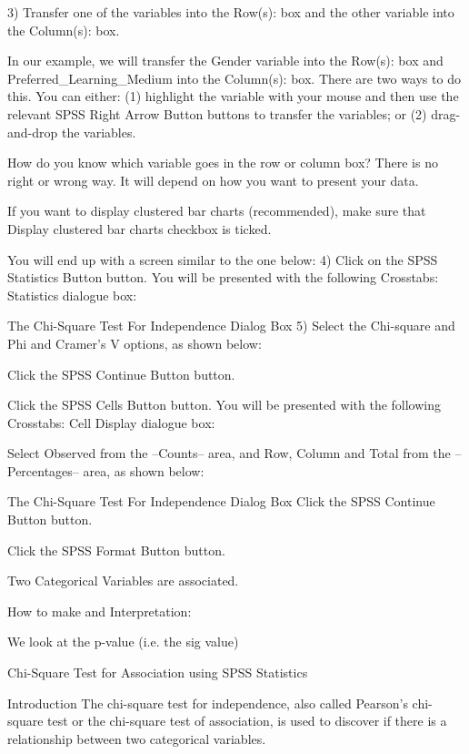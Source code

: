 3) Transfer one of the variables into the Row(s): box and the other variable into the Column(s): box. 

In our example, we will transfer the Gender variable into the Row(s): box and Preferred_Learning_Medium into the Column(s): box. There are two ways to do this. You can either: (1) highlight the variable with your mouse and then use the relevant SPSS Right Arrow Button buttons to transfer the variables; or (2) drag-and-drop the variables. 

How do you know which variable goes in the row or column box? There is no right or wrong way. It will depend on how you want to present your data.

If you want to display clustered bar charts (recommended), make sure that Display clustered bar charts checkbox is ticked.

You will end up with a screen similar to the one below:
4) Click on the SPSS Statistics Button button. You will be presented with the following Crosstabs: Statistics dialogue box:

The Chi-Square Test For Independence Dialog Box
5) Select the Chi-square and Phi and Cramer's V options, as shown below:

Click the SPSS Continue Button button.

Click the SPSS Cells Button button. You will be presented with the following Crosstabs: Cell Display dialogue box:

Select Observed from the –Counts– area, and Row, Column and Total from the –Percentages– area, as shown below:

The Chi-Square Test For Independence Dialog Box
Click the SPSS Continue Button button.

Click the SPSS Format Button button.

Two Categorical Variables are associated.



How to make and Interpretation:

We look at the p-value (i.e. the sig value)


Chi-Square Test for Association using SPSS Statistics

Introduction
The chi-square test for independence, also called Pearson's chi-square test or the chi-square test of association, is used to discover if there is a relationship between two categorical variables.


